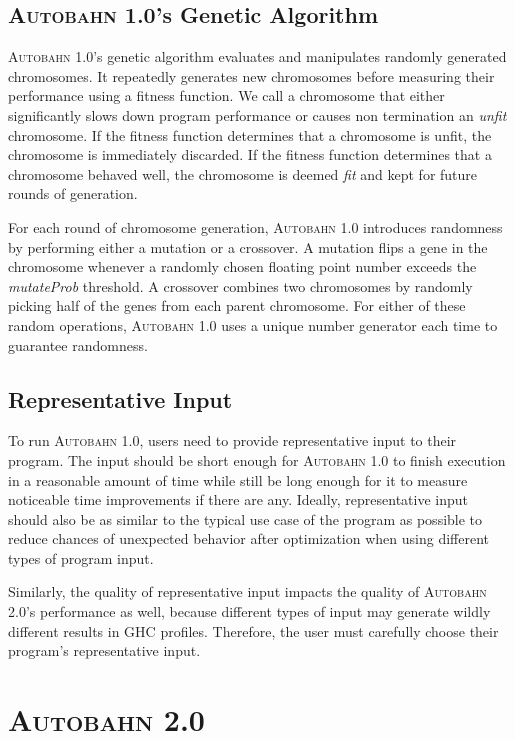 \documentclass[format=sigplan, review=true]{acmart}
\newcommand{\unfit}[0]{unfit}
\newcommand{\Ao}[0]{\textsc{Autobahn 1.0}}
\newcommand{\At}[0]{\textsc{Autobahn 2.0}}
\newcommand{\fit}[0]{fit}
\begin{document}
\subsection{\Ao{}'s Genetic Algorithm}

\Ao{}'s genetic algorithm evaluates and manipulates randomly generated chromosomes. It repeatedly generates new chromosomes before measuring their performance using a fitness function. We call a chromosome that either significantly slows down program performance or causes non termination an \textit{\unfit{}} chromosome. If the fitness function determines that a chromosome is \unfit{}, the chromosome is immediately discarded. If the fitness function determines that a chromosome behaved well, the chromosome is deemed \textit{\fit{}} and kept for future rounds of generation. 

For each round of chromosome generation, \Ao{} introduces randomness by performing either a mutation or a crossover. A mutation flips a gene in the chromosome whenever a randomly chosen floating point number exceeds the \textit{mutateProb} threshold. A crossover combines two chromosomes by randomly picking half of the genes from each parent chromosome. For either of these random operations, \Ao{} uses a unique number generator each time to guarantee randomness. 

\subsection{Representative Input}

To run \Ao{}, users need to provide representative input to their program. The input should be short enough for \Ao{} to finish execution in a reasonable amount of time while still be long enough for it to measure noticeable time improvements if there are any. Ideally, representative input should also be as similar to the typical use case of the program as possible to reduce chances of unexpected behavior after optimization when using different types of program input.

Similarly, the quality of representative input impacts the quality of \At{}'s performance as well, because different types of input may generate wildly different results in GHC profiles. Therefore, the user must carefully choose their program's representative input.

\section{\At{}}
\end{document}
